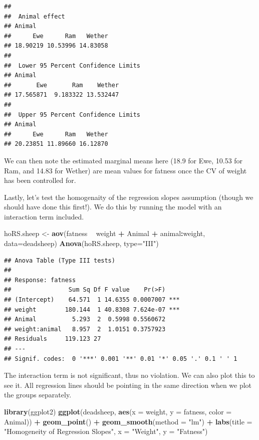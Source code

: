 \documentclass[]{book}
\newenvironment{Shaded}{\begin{snugshade}}{\end{snugshade}}
\newcommand{\KeywordTok}[1]{\textcolor[rgb]{0.13,0.29,0.53}{\textbf{#1}}}
\newcommand{\DataTypeTok}[1]{\textcolor[rgb]{0.13,0.29,0.53}{#1}}
\newcommand{\StringTok}[1]{\textcolor[rgb]{0.31,0.60,0.02}{#1}}
\newcommand{\OperatorTok}[1]{\textcolor[rgb]{0.81,0.36,0.00}{\textbf{#1}}}
\newcommand{\NormalTok}[1]{#1}
\theoremstyle{definition}
\theoremstyle{definition}
\theoremstyle{definition}
\theoremstyle{remark}
\begin{document}
\begin{verbatim}
## 
##  Animal effect
## Animal
##      Ewe      Ram   Wether 
## 18.90219 10.53996 14.83058 
## 
##  Lower 95 Percent Confidence Limits
## Animal
##       Ewe       Ram    Wether 
## 17.565871  9.183322 13.532447 
## 
##  Upper 95 Percent Confidence Limits
## Animal
##      Ewe      Ram   Wether 
## 20.23851 11.89660 16.12870
\end{verbatim}

We can then note the estimated marginal means here (18.9 for Ewe, 10.53
for Ram, and 14.83 for Wether) are mean values for fatness once the CV
of weight has been controlled for.

Lastly, let's test the homogenaity of the regression slopes assumption
(though we should have done this first!). We do this by running the
model with an interaction term included.

\begin{Shaded}
\begin{Highlighting}[]
\NormalTok{hoRS.sheep <-}\StringTok{ }\KeywordTok{aov}\NormalTok{(fatness }\OperatorTok{~}\StringTok{ }\NormalTok{weight }\OperatorTok{+}\StringTok{ }\NormalTok{Animal }\OperatorTok{+}\StringTok{ }\NormalTok{animal}\OperatorTok{:}\NormalTok{weight, }\DataTypeTok{data=}\NormalTok{deadsheep)}
\KeywordTok{Anova}\NormalTok{(hoRS.sheep, }\DataTypeTok{type=}\StringTok{"III"}\NormalTok{)}
\end{Highlighting}
\end{Shaded}

\begin{verbatim}
## Anova Table (Type III tests)
## 
## Response: fatness
##                Sum Sq Df F value    Pr(>F)    
## (Intercept)    64.571  1 14.6355 0.0007007 ***
## weight        180.144  1 40.8308 7.624e-07 ***
## Animal          5.293  2  0.5998 0.5560672    
## weight:animal   8.957  2  1.0151 0.3757923    
## Residuals     119.123 27                      
## ---
## Signif. codes:  0 '***' 0.001 '**' 0.01 '*' 0.05 '.' 0.1 ' ' 1
\end{verbatim}

The interaction term is not significant, thus no violation. We can also
plot this to see it. All regression lines should be pointing in the same
direction when we plot the groups separately.

\begin{Shaded}
\begin{Highlighting}[]
\KeywordTok{library}\NormalTok{(ggplot2)}
\KeywordTok{ggplot}\NormalTok{(deadsheep, }\KeywordTok{aes}\NormalTok{(}\DataTypeTok{x =}\NormalTok{ weight, }\DataTypeTok{y =}\NormalTok{ fatness, }\DataTypeTok{color =}\NormalTok{ Animal)) }\OperatorTok{+}\StringTok{ }
\StringTok{  }\KeywordTok{geom_point}\NormalTok{() }\OperatorTok{+}\StringTok{ }
\StringTok{  }\KeywordTok{geom_smooth}\NormalTok{(}\DataTypeTok{method =} \StringTok{"lm"}\NormalTok{) }\OperatorTok{+}\StringTok{ }
\StringTok{  }\KeywordTok{labs}\NormalTok{(}\DataTypeTok{title =} \StringTok{"Homogeneity of Regression Slopes"}\NormalTok{, }\DataTypeTok{x =} \StringTok{"Weight"}\NormalTok{, }\DataTypeTok{y =} \StringTok{"Fatness"}\NormalTok{)}
\end{Highlighting}
\end{Shaded}
\end{document}
